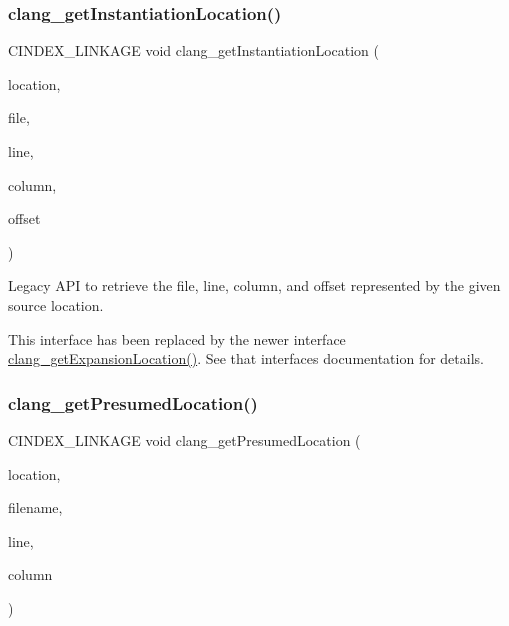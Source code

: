 \subsubsection{\texorpdfstring{clang\+\_\+get\+Instantiation\+Location()}{clang\_getInstantiationLocation()}}
{\footnotesize\ttfamily C\+I\+N\+D\+E\+X\+\_\+\+L\+I\+N\+K\+A\+GE void clang\+\_\+get\+Instantiation\+Location (\begin{DoxyParamCaption}\item[{\mbox{\hyperlink{structCXSourceLocation}{C\+X\+Source\+Location}}}]{location,  }\item[{\mbox{\hyperlink{group__CINDEX__FILES_gacfcea9c1239c916597e2e5b3e109215a}{C\+X\+File}} $\ast$}]{file,  }\item[{unsigned $\ast$}]{line,  }\item[{unsigned $\ast$}]{column,  }\item[{unsigned $\ast$}]{offset }\end{DoxyParamCaption})}



Legacy A\+PI to retrieve the file, line, column, and offset represented by the given source location. 

This interface has been replaced by the newer interface \mbox{\hyperlink{group__CINDEX__LOCATIONS_gadee4bea0fa34550663e869f48550eb1f}{clang\+\_\+get\+Expansion\+Location()}}. See that interface\textquotesingle{}s documentation for details. \mbox{\label{group__CINDEX__LOCATIONS_ga03508d9c944feeb3877515a1b08d36f9}} 
\subsubsection{\texorpdfstring{clang\+\_\+get\+Presumed\+Location()}{clang\_getPresumedLocation()}}
{\footnotesize\ttfamily C\+I\+N\+D\+E\+X\+\_\+\+L\+I\+N\+K\+A\+GE void clang\+\_\+get\+Presumed\+Location (\begin{DoxyParamCaption}\item[{\mbox{\hyperlink{structCXSourceLocation}{C\+X\+Source\+Location}}}]{location,  }\item[{\mbox{\hyperlink{structCXString}{C\+X\+String}} $\ast$}]{filename,  }\item[{unsigned $\ast$}]{line,  }\item[{unsigned $\ast$}]{column }\end{DoxyParamCaption})}



